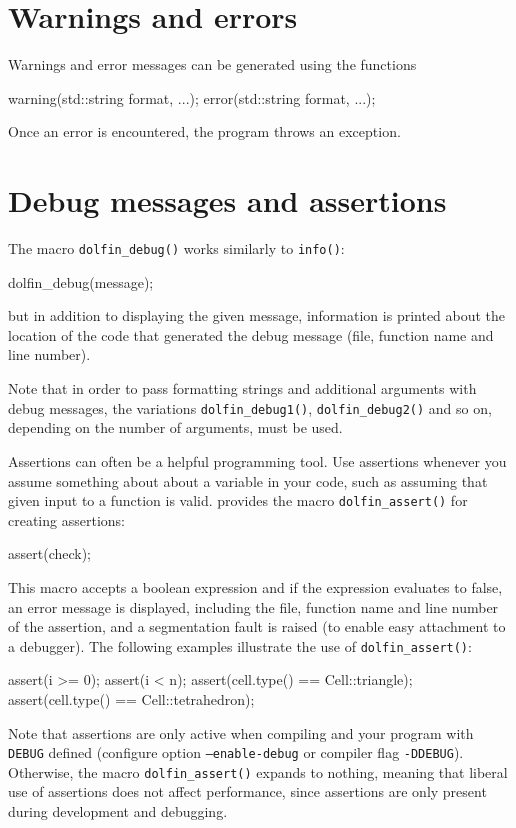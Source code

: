 \section{Warnings and errors}

Warnings and error messages can be generated using the functions
\begin{code}
warning(std::string format, ...);
error(std::string format, ...);
\end{code}
Once an error is encountered, the program throws an exception.

\section{Debug messages and assertions}

The macro \texttt{dolfin\_debug()} works similarly to
\texttt{info()}:
\begin{code}
dolfin_debug(message);
\end{code}
but in addition to displaying the given message, information is printed about
the location of the code that generated the debug message (file,
function name and line number).

Note that in order to pass formatting strings and additional arguments
with debug messages, the variations \texttt{dolfin\_debug1()},
\texttt{dolfin\_debug2()} and so on, depending on the number of
arguments, must be used.

Assertions can often be a helpful programming tool. Use assertions
whenever you assume something about about a variable in your code,
such as assuming that given input to a function is valid. \dolfin{}
provides the macro \texttt{dolfin\_assert()} for creating assertions:
\begin{code}
assert(check);
\end{code}
This macro accepts a boolean expression and if the expression
evaluates to false, an error message is displayed, including the
file, function name and line number of the assertion, and a
segmentation fault is raised (to enable easy attachment to a
debugger). The following examples illustrate the use of
\texttt{dolfin\_assert()}:
\begin{code}
assert(i >= 0);
assert(i < n);
assert(cell.type() == Cell::triangle);
assert(cell.type() == Cell::tetrahedron);
\end{code}
Note that assertions are only active when compiling
\dolfin{} and your program with \texttt{DEBUG} defined (configure
option \texttt{--enable-debug} or compiler flag \texttt{-DDEBUG}).
Otherwise, the macro \texttt{dolfin\_assert()} expands to nothing,
meaning that liberal use of assertions does not affect performance,
since assertions are only present during development and
debugging.

